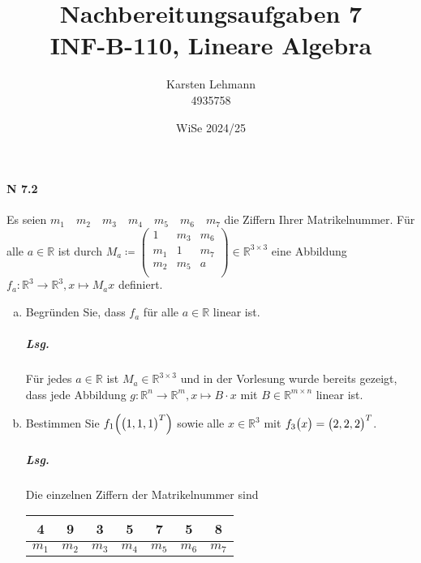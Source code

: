\documentclass{scrreprt}
\author{Karsten Lehmann \\ 4935758}
\date{WiSe 2024/25}
\title{Nachbereitungsaufgaben 7\\INF-B-110, Lineare Algebra}
\begin{document}
\paragraph{N 7.2}
Es seien $m_1 \quad m_2 \quad m_3 \quad m_4 \quad m_5 \quad m_6 \quad m_7$ die
Ziffern Ihrer Matrikelnummer.
Für alle $a \in \mathbb{R}$ ist durch $M_a \coloneqq \begin{pmatrix}
  1   & m_3 & m_6 \\
  m_1 & 1   & m_7 \\
  m_2 & m_5 & a   \\
\end{pmatrix} \in \mathbb{R}^{3 \times 3}$ eine Abbildung
$f_a \colon \mathbb{R}^3 \to \mathbb{R}^3, x \mapsto M_a x$ definiert.
\begin{enumerate}[(a)]
\item Begründen Sie, dass $f_a$ für alle $a \in \mathbb{R}$ linear ist.

  \subparagraph{Lsg.} Für jedes $a \in \mathbb{R}$ ist
  $M_a \in \mathbb{R}^{3 \times 3}$ und in der Vorlesung wurde bereits gezeigt,
  dass jede Abbildung $g \colon \mathbb{R}^n \to \mathbb{R}^m, x \mapsto B \cdot x$
  mit $B \in \mathbb{R}^{m \times n}$ linear ist.

\item Bestimmen Sie $f_1\qty(\qty\big(1, 1, 1)^T)$ sowie alle
  $x \in \mathbb{R}^3$ mit $f_3\qty\big(x) = \qty\big(2, 2, 2)^T$.

  \subparagraph{Lsg.} Die einzelnen Ziffern der Matrikelnummer sind

  \begin{tabular}{|c|c|c|c|c|c|c|}
    \hline
    4 & 9 & 3 & 5 & 7 & 5 & 8 \\
    \hline
    $m_1$ & $m_2$ & $m_3$ & $m_4$ & $m_5$ & $m_6$ & $m_7$ \\
    \hline
  \end{tabular}


\end{enumerate}
\end{document}
